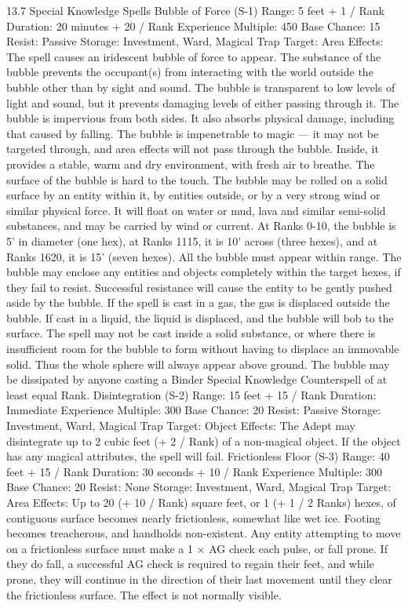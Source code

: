 \documentclass[a4paper]{article}
\begin{document}
\begin{multicols}{3}
13.7 Special Knowledge Spells
Bubble of Force (S-1)
Range: 5 feet + 1 / Rank
Duration: 20 minutes + 20 / Rank
Experience Multiple: 450
Base Chance: 15%
Resist: Passive
Storage: Investment, Ward, Magical Trap
Target: Area
Effects: The spell causes an iridescent bubble of
force to appear. The substance of the bubble prevents the occupant(s) from interacting with the
world outside the bubble other than by sight and
sound. The bubble is transparent to low levels of
light and sound, but it prevents damaging levels of
either passing through it. The bubble is impervious
from both sides. It also absorbs physical damage,
including that caused by falling. The bubble is
impenetrable to magic — it may not be targeted
through, and area effects will not pass through the
bubble. Inside, it provides a stable, warm and dry
environment, with fresh air to breathe. The surface
of the bubble is hard to the touch. The bubble may
be rolled on a solid surface by an entity within it,
by entities outside, or by a very strong wind or
similar physical force. It will float on water or
mud, lava and similar semi-solid substances, and
may be carried by wind or current. At Ranks 0-10,
the bubble is 5’ in diameter (one hex), at Ranks 1115, it is 10’ across (three hexes), and at Ranks 1620, it is 15’ (seven hexes). All the bubble must
appear within range. The bubble may enclose any
entities and objects completely within the target
hexes, if they fail to resist. Successful resistance
will cause the entity to be gently pushed aside by
the bubble. If the spell is cast in a gas, the gas is
displaced outside the bubble. If cast in a liquid, the
liquid is displaced, and the bubble will bob to the
surface. The spell may not be cast inside a solid
substance, or where there is insufficient room for
the bubble to form without having to displace an
immovable solid. Thus the whole sphere will always appear above ground. The bubble may be
dissipated by anyone casting a Binder Special
Knowledge Counterspell of at least equal Rank.
Disintegration (S-2)
Range: 15 feet + 15 / Rank
Duration: Immediate
Experience Multiple: 300
Base Chance: 20%
Resist: Passive
Storage: Investment, Ward, Magical Trap
Target: Object
Effects: The Adept may disintegrate up to 2 cubic
feet (+ 2 / Rank) of a non-magical object. If the
object has any magical attributes, the spell will fail.
Frictionless Floor (S-3)
Range: 40 feet + 15 / Rank
Duration: 30 seconds + 10 / Rank
Experience Multiple: 300
Base Chance: 20%
Resist: None
Storage: Investment, Ward, Magical Trap
Target: Area
Effects: Up to 20 (+ 10 / Rank) square feet, or 1 (+
1 / 2 Ranks) hexes, of contiguous surface becomes
nearly frictionless, somewhat like wet ice. Footing
becomes treacherous, and handholds non-existent.
Any entity attempting to move on a frictionless
surface must make a 1 × AG check each pulse, or
fall prone. If they do fall, a successful AG check is
required to regain their feet, and while prone, they
will continue in the direction of their last movement until they clear the frictionless surface. The
effect is not normally visible.


\end{multicols}
\end{document}
